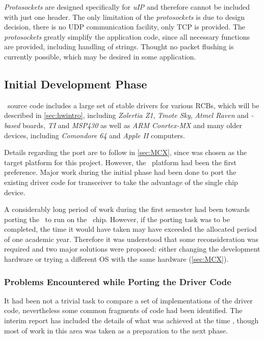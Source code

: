   \emph{Protosockets} are designed specifically for \emph{uIP} and therefore 
 cannot be included with just one header. The only limitation of the
 \emph{protosockets} is due to design decision, there is no UDP communication
 facility, only TCP is provided. The \emph{protosockets} greatly simplify the
 application code, since all necessary functions are provided, including
 handling of strings. Thought no packet flushing is currently possible, which
 may be desired in some application.

\subsection{Initial Development Phase}

  \Contiki\ source code includes a large set of stable drivers for various
 RCBs, which will be described in \ref{sec:hwintro}, including \emph{Zolertia Z1},
 \emph{Tmote Sky}, \emph{Atmel Raven} and \emph{-based} boards,
 \emph{TI}  and \emph{MSP430} as well as \emph{ARM Conrtex-MX}
 and many older devices, including \emph{Comondore 64} and \emph{Apple II}
 computers.

 Details regarding the  port \cite{links:contiki:port:mc1322x}
 are to follow in \ref{sec:MCX}, since  was chosen as the
 target platform for this project. However, the \RFA\ platform had been the
 first preference. Major work during the initial phase had been done to
 port the existing driver code for  transceiver to take the
 advantage of the single chip device. %


  A considerably long period of work during the first semester had been
 towards porting the \ContikiOS\ to run on the \RFA\ chip. However, if
 the porting task was to be completed, the time it would have taken may
 have exceeded the allocated period of one academic year. Therefore it
 was understood that some reconsideration was required and two major
 solutions were proposed: either changing the development hardware or
 trying a different OS with the same hardware (\ref{sec:MCX}).

\subsubsection{Problems Encountered while Porting the Driver Code}

  It had been not a trivial task to compare a set of implementations
 of the driver code, nevertheless some common fragments of code had
 been identified. The interim report has included the details of what
 was achieved at the time \cite{wmi:irep}, though most of work in this
 area was taken as a preparation to the next phase.

